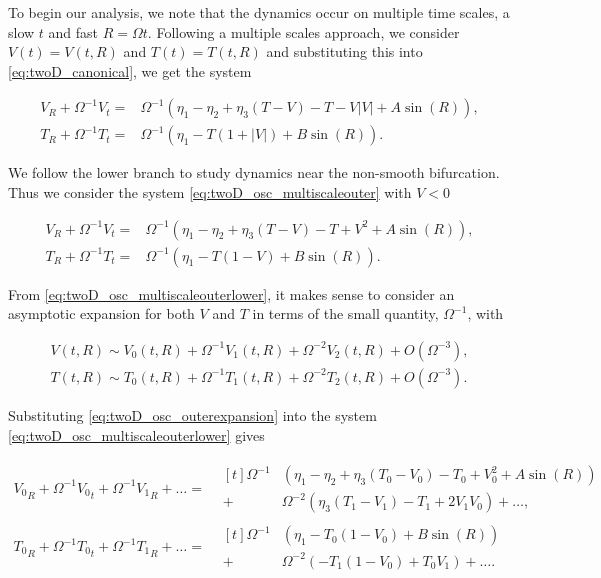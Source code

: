 \indent To begin our analysis, we note that the dynamics occur on multiple time scales, a slow $t$ and fast $R = \Omega t$. Following a multiple scales approach, we consider $V(t)=V(t,R)$ and $T(t)=T(t,R)$ and substituting this into \eqref{eq:twoD_canonical}, we get the system

\begin{equation}\label{eq:twoD_osc_multiscaleouter}
\begin{aligned}
V_R+\Omega^{-1}V_t = & \Omega^{-1}\left(\eta_1-\eta_2+\eta_3(T-V)-T-V|V|+A\sin(R)\right),\\
T_R+\Omega^{-1}T_t = & \Omega^{-1}\left(\eta_1-T(1+|V|)+B\sin(R)\right).
\end{aligned}
\end{equation}

We follow the lower branch to study dynamics near the non-smooth bifurcation. Thus we consider the system \eqref{eq:twoD_osc_multiscaleouter} with $V<0$

\begin{equation}\label{eq:twoD_osc_multiscaleouterlower}
\begin{aligned}
V_R+\Omega^{-1}V_t = & \Omega^{-1}\left(\eta_1-\eta_2+\eta_3(T-V)-T+V^2+A\sin(R)\right),\\
T_R+\Omega^{-1}T_t = & \Omega^{-1}\left(\eta_1-T(1-V)+B\sin(R)\right).
\end{aligned}
\end{equation}

From \eqref{eq:twoD_osc_multiscaleouterlower}, it makes sense to consider an asymptotic expansion for both $V$ and $T$ in terms of the small quantity, $\Omega^{-1}$, with

\begin{equation}\label{eq:twoD_osc_outerexpansion}
\begin{aligned}
V(t,R)\sim V_0(t,R) +\Omega^{-1}V_1(t,R) +\Omega^{-2}V_2(t,R)+O(\Omega^{-3}),\\
T(t,R)\sim T_0(t,R) +\Omega^{-1}T_1(t,R) +\Omega^{-2}T_2(t,R)+O(\Omega^{-3}).
\end{aligned}
\end{equation}

Substituting \eqref{eq:twoD_osc_outerexpansion} into the system \eqref{eq:twoD_osc_multiscaleouterlower} gives

\begin{equation*}
\begin{aligned}
{V_0}_R+\Omega^{-1}{V_0}_t+\Omega^{-1}{V_1}_R+\ldots=&\begin{aligned}[t]\Omega^{-1}&(\eta_1-\eta_2+\eta_3(T_0-V_0)-T_0+V_0^2+A\sin(R))\\
+&\Omega^{-2}(\eta_3(T_1-V_1)-T_1+2V_1V_0)+\ldots,
\end{aligned}\\
{T_0}_R+\Omega^{-1}{T_0}_t+\Omega^{-1}{T_1}_R+\ldots=&\begin{aligned}[t] \Omega^{-1}&(\eta_1-T_0(1-V_0)+B\sin(R))\\
+&\Omega^{-2}(-T_1(1-V_0)+T_0V_1)+\ldots.
\end{aligned}
\end{aligned}
\end{equation*}

